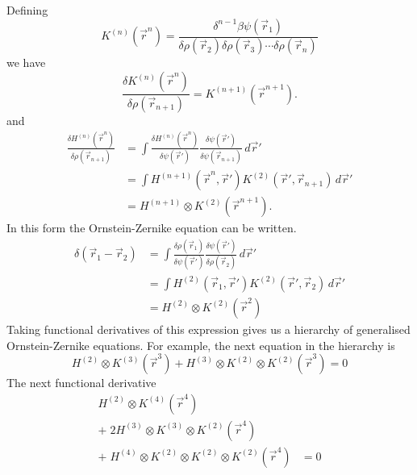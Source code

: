 Defining
\begin{equation*}
  K^{(n)}(\vec{r}^n) =
  \frac{\delta^{n-1} \beta\psi(\vec{r}_1)}{\delta \rho(\vec{r}_2) \delta \rho(\vec{r}_3) \cdots \delta \rho(\vec{r}_n)}
\end{equation*}
we have
\begin{equation*}
  \frac{\delta K^{(n)}(\vec{r}^n)}{\delta \rho(\vec{r}_{n+1})} =
  K^{(n+1)}(\vec{r}^{n+1}).
\end{equation*}
and
\begin{equation*}
  \begin{aligned}
    \frac{\delta H^{(n)}(\vec{r}^n)}{\delta \rho(\vec{r}_{n+1})}
    &=
    \int
    \frac{\delta H^{(n)}(\vec{r}^n)}{\delta \psi(\vec{r}')}
    \frac{\delta \psi(\vec{r}')}{\delta \psi(\vec{r}_{n+1})}
    \, d\vec{r}' \\
    &=
    \int
    H^{(n+1)}(\vec{r}^n, \vec{r}')
    K^{(2)}(\vec{r}', \vec{r}_{n+1})
    \, d\vec{r}' \\
    &=
    H^{(n+1)} \otimes K^{(2)}(\vec{r}^{n+1}).
  \end{aligned}
\end{equation*}
In this form the Ornstein-Zernike equation can be written.
\begin{equation*}
  \begin{aligned}
    \delta(\vec{r}_1 - \vec{r}_2) &=
    \int
    \frac{\delta \rho(\vec{r}_1)}{\delta \psi(\vec{r}')}
    \frac{\delta \psi(\vec{r}')}{\delta \rho(\vec{r}_2)}
    \, d\vec{r}' \\
    &=
    \int
    H^{(2)}(\vec{r}_1, \vec{r}') K^{(2)}(\vec{r}', \vec{r}_2)
    \, d\vec{r}' \\
    &=
    H^{(2)} \otimes K^{(2)} (\vec{r}^2)
  \end{aligned}
\end{equation*}
Taking functional derivatives of this expression gives us a hierarchy of generalised Ornstein-Zernike equations.
For example, the next equation in the hierarchy is
\begin{equation*}
  H^{(2)} \otimes K^{(3)} (\vec{r}^3) +
  H^{(3)} \otimes K^{(2)} \otimes K^{(2)} (\vec{r}^3) = 0
\end{equation*}
The next functional derivative
\begin{equation}
  \begin{aligned}
  H^{(2)} \otimes K^{(4)} (\vec{r}^4) & \\
  + \; 2 H^{(3)} \otimes K^{(3)} \otimes K^{(2)} (\vec{r}^4) & \\
  + \; H^{(4)} \otimes K^{(2)} \otimes K^{(2)} \otimes K^{(2)} (\vec{r}^4)
  &= 0
  \end{aligned}
\end{equation}
